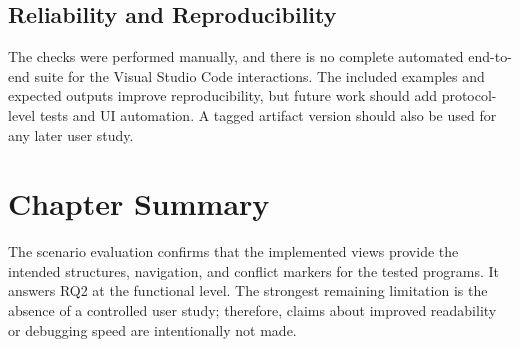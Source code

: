 \subsection{Reliability and Reproducibility}

The checks were performed manually, and there is no complete automated end-to-end suite for the Visual Studio Code interactions. The included examples and expected outputs improve reproducibility, but future work should add protocol-level tests and UI automation. A tagged artifact version should also be used for any later user study.

\section{Chapter Summary}

The scenario evaluation confirms that the implemented views provide the intended structures, navigation, and conflict markers for the tested programs. It answers RQ2 at the functional level. The strongest remaining limitation is the absence of a controlled user study; therefore, claims about improved readability or debugging speed are intentionally not made.




